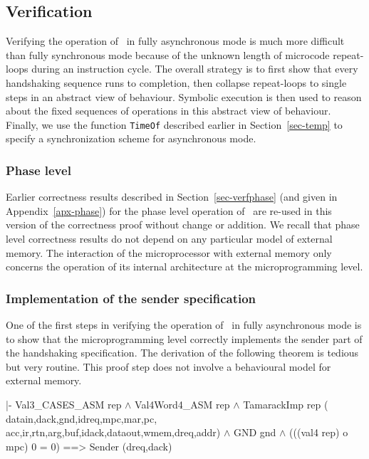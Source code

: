 \subsection{Verification}

Verifying the operation of \Tamarack\ in fully asynchronous mode
is much more difficult than fully synchronous mode because of
the unknown length of microcode repeat-loops during
an instruction cycle.
The overall strategy is to first show that every handshaking sequence
runs to completion,
then collapse repeat-loops to single steps in an abstract view
of behaviour.
Symbolic execution is then used to reason about the fixed sequences
of operations in this abstract view of behaviour.
Finally, we use the function \verb"TimeOf" described earlier
in Section~\ref{sec-temp} to specify a synchronization scheme
for asynchronous mode.

\subsubsection{Phase level}

Earlier correctness results described in Section~\ref{sec-verfphase}
(and given in Appendix~\ref{apx-phase})
for the phase level operation of \Tamarack\
are re-used in this version of the correctness proof without
change or addition.
We recall that phase level correctness results do not depend
on any particular model of external memory.
The interaction of the microprocessor with external memory
only concerns the operation of its internal architecture at
the microprogramming level.

\subsubsection{Implementation of the sender specification}

One of the first steps in verifying the operation of \Tamarack\
in fully asynchronous mode is to show that the microprogramming
level correctly implements the sender part of the handshaking specification.
The derivation of the following theorem is tedious but
very routine.
This proof step does not involve a behavioural model for external memory.

\begintt
|- Val3_CASES_ASM rep \(\wedge\)
   Val4Word4_ASM rep \(\wedge\)
   TamarackImp rep (
     datain,dack,gnd,idreq,mpc,mar,pc,
     acc,ir,rtn,arg,buf,idack,dataout,wmem,dreq,addr) \(\wedge\)
   GND gnd \(\wedge\)
   (((val4 rep) o mpc) 0 = 0)
    ==>
   Sender (dreq,dack)
\endtt

